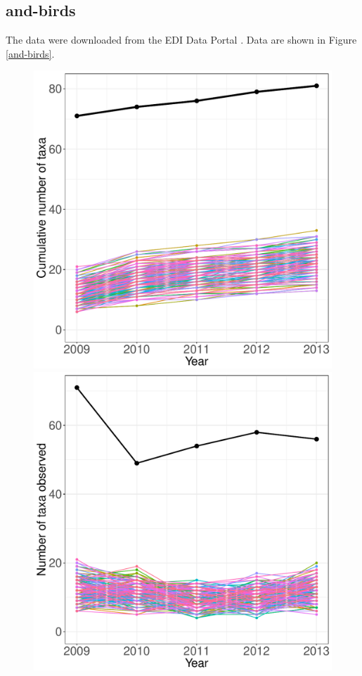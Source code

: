 \documentclass[11pt, oneside]{article}
\begin{document}
\subsection {and-birds}
The data were downloaded from the EDI Data Portal \citep{and-birds}.
Data are shown in Figure \ref{and-birds}.

\begin{figure}[h!]
\centering
\includegraphics[scale = 0.4]{and-birds-wisnoski_species_accumulation_curve.pdf}
\includegraphics[scale = 0.4]{and-birds-wisnoski_num_taxa_over_time.pdf}

\end{figure}
\end{document}
